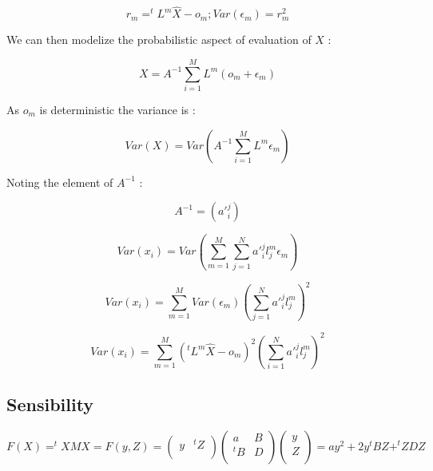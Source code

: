 \begin{equation}
      r_m  = ^tL^m \hat{X} - o_m  ; Var({\epsilon}_m) = r_m^2
\end{equation}

We can then modelize the probabilistic aspect of evaluation of $X$ :

\begin{equation}
     X  =  A^{-1}  \sum\limits_{i=1}^M   {L^m}  (o_m + {\epsilon}_m) 
\end{equation}

As $o_m$ is deterministic the variance is :

\begin{equation}
     Var(X)  =  Var (A^{-1}  \sum\limits_{i=1}^M   {L^m}  {\epsilon}_m)
\end{equation}


Noting the element of $A^{-1}$ :

\begin{equation}
     A^{-1} = ( {a'}_i^j)
\end{equation}

\begin{equation}
     Var(x_i)  =   Var({\sum\limits_{m=1}^M}  {\sum\limits_{j=1}^N}  {a'}_i^j   {l^m_j}   {\epsilon}_m)
\end{equation}


\begin{equation}
     Var(x_i)  =   \sum\limits_{m=1}^M  Var({\epsilon}_m)  (\sum\limits_{j=1}^N   {a'}_i^j  {l^m_j}   ) ^2 
\end{equation}



\begin{equation}
     Var(x_i)  =   \sum\limits_{m=1}^M  (^tL^m \hat{X} - o_m )^2  (\sum\limits_{i=1}^N  {a'}_i^j   {l^m_j}  ) ^2 
\end{equation}


\subsection{Sensibility}


\begin{equation}
F(X) = ^t X M X = F(y,Z)= 
\left( \begin{array}{cc} 
              y &  ^t Z \\ 
        \end{array} 
\right)
\left( \begin{array}{cc} 
              a & B \\ 
              ^t B  & D\\ 
        \end{array} 
\right)
\left( \begin{array}{c} 
              y \\ 
              Z \\ 
        \end{array} 
\right)
= a y^2 + 2y^t B Z + ^t Z D Z
\label{EqSensib1}
\end{equation}

